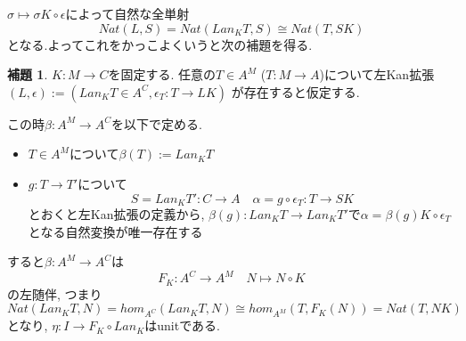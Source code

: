 \documentclass[dvipdfmx,a4paper,11pt]{report}
\theoremstyle{definition}
\newtheorem{lem}[thm]{補題}
\begin{document}
$\sigma \mapsto \sigma K \circ \epsilon $によって自然な全単射
$$
Nat (L, S)=Nat (Lan_{K}T, S) \cong Nat(T, SK)
$$
となる.よってこれをかっこよくいうと次の補題を得る. 

 \begin{tcolorbox}
 [colback = white, colframe = green!35!black, fonttitle = \bfseries,breakable = true]
\begin{lem}
\label{lem-leftkan-adjoint}
$K : M \to C$を固定する. 
任意の$T \in A^{M}$ ($T : M \to A$)について左Kan拡張
$(L, \epsilon) := (Lan_{K}T \in A^C, \epsilon_{T}: T \to LK)$
が存在すると仮定する.

この時$\beta : A^M \to A^C$を以下で定める. 
\begin{itemize}
\item $T \in A^{M}$について$\beta (T) := Lan_{K}T$
\item $g : T \to T'$について
$$
S = Lan_{K}T' : C \to A
\quad
\alpha =g\circ \epsilon_T : T \to SK 
$$
とおくと左Kan拡張の定義から, $\beta(g) : Lan_{K}T \to Lan_{K}T'$で$\alpha = \beta(g)K \circ \epsilon_T $となる自然変換が唯一存在する
\end{itemize}
すると$\beta : A^M \to A^C$は
$$
F_K : A^C \to A^M \quad N \mapsto N \circ K
$$
の左随伴, つまり
$$
Nat (Lan_{K}T, N)
=
 hom_{A^C}(Lan_{K}T, N)
 \cong
 hom_{A^M}(T, F_{K}(N)) = Nat(T,NK)
$$
となり, $\eta :  I \to F_{K}\circ Lan_{K} $はunitである. 
\end{lem}
\end{tcolorbox}
\end{document}
